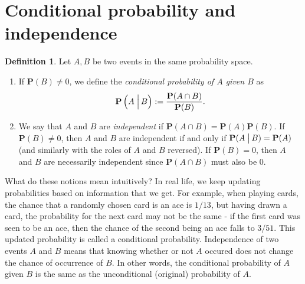 \documentclass[preprint,  11pt]{amsart}
\theoremstyle{plain} %
\theoremstyle{definition} %
\newtheorem{definition}[theorem]{Definition}
\begin{document}
\section{Conditional probability and independence}
\begin{definition} Let $A,B$ be two events in the same probability space. 
\begin{enumerate}\setlength\itemsep{6pt}
\item If $\mathbf{P}(B)\not=0$, we define the {\em conditional probability of $A$ given $B$} as $$\mathbf{P}\left(A\left.\vphantom{\hbox{\Large (}}\right| B\right):=\frac{\mathbf{P}(A\cap B)}{\mathbf{P}(B)}.$$
\item We say that $A$ and $B$ are {\em independent} if $\mathbf{P}(A\cap B)=\mathbf{P}(A)\mathbf{P}(B)$. If $\mathbf{P}(B)\not=0$, then $A$ and $B$ are independent if and only if $\mathbf{P}(A\left.\vphantom{\hbox{\large (}}\right| B)=\mathbf{P}(A)$ (and similarly with the roles of $A$ and $B$ reversed). If $\mathbf{P}(B)=0$, then $A$ and $B$ are necessarily independent since $\mathbf{P}(A\cap B)$ must also be $0$.
\end{enumerate}
\end{definition}
What do these notions mean intuitively? In real life, we keep updating probabilities based on information that we get. For example, when playing cards, the chance that a randomly chosen card is an ace is $1/13$, but having drawn a card, the probability for the next card may not be the same - if the first card was seen to be an ace, then the chance of the second being an ace falls to $3/51$. This updated probability is called a conditional probability. Independence of two events $A$ and $B$ means that knowing whether or not $A$ occured does not change the chance of occurrence of $B$. In other words, the conditional probability of $A$ given $B$ is the same as the unconditional (original) probability of $A$.
\end{document}
